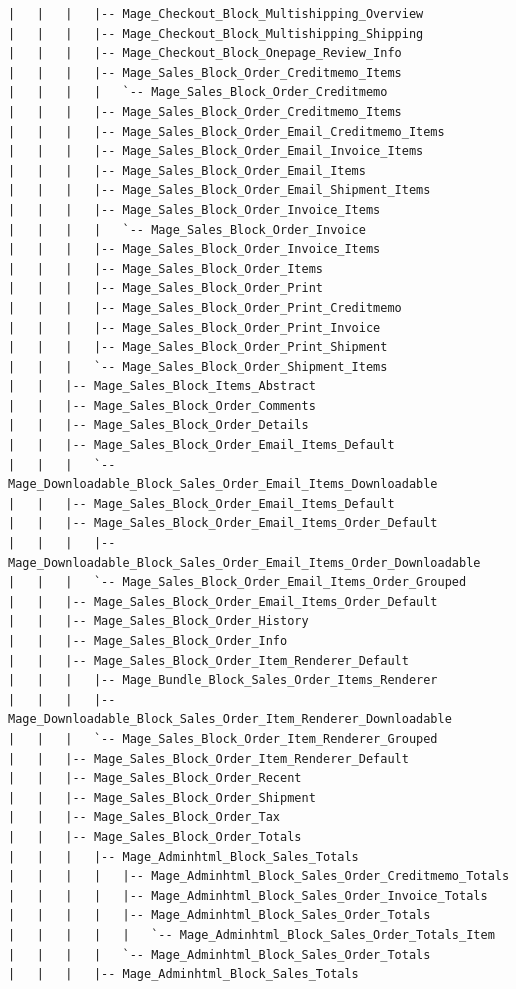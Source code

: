 \documentclass[oneside]{book}
\begin{document}
\begin{lstlisting}
|   |   |   |-- Mage_Checkout_Block_Multishipping_Overview
|   |   |   |-- Mage_Checkout_Block_Multishipping_Shipping
|   |   |   |-- Mage_Checkout_Block_Onepage_Review_Info
|   |   |   |-- Mage_Sales_Block_Order_Creditmemo_Items
|   |   |   |   `-- Mage_Sales_Block_Order_Creditmemo
|   |   |   |-- Mage_Sales_Block_Order_Creditmemo_Items
|   |   |   |-- Mage_Sales_Block_Order_Email_Creditmemo_Items
|   |   |   |-- Mage_Sales_Block_Order_Email_Invoice_Items
|   |   |   |-- Mage_Sales_Block_Order_Email_Items
|   |   |   |-- Mage_Sales_Block_Order_Email_Shipment_Items
|   |   |   |-- Mage_Sales_Block_Order_Invoice_Items
|   |   |   |   `-- Mage_Sales_Block_Order_Invoice
|   |   |   |-- Mage_Sales_Block_Order_Invoice_Items
|   |   |   |-- Mage_Sales_Block_Order_Items
|   |   |   |-- Mage_Sales_Block_Order_Print
|   |   |   |-- Mage_Sales_Block_Order_Print_Creditmemo
|   |   |   |-- Mage_Sales_Block_Order_Print_Invoice
|   |   |   |-- Mage_Sales_Block_Order_Print_Shipment
|   |   |   `-- Mage_Sales_Block_Order_Shipment_Items
|   |   |-- Mage_Sales_Block_Items_Abstract
|   |   |-- Mage_Sales_Block_Order_Comments
|   |   |-- Mage_Sales_Block_Order_Details
|   |   |-- Mage_Sales_Block_Order_Email_Items_Default
|   |   |   `-- Mage_Downloadable_Block_Sales_Order_Email_Items_Downloadable
|   |   |-- Mage_Sales_Block_Order_Email_Items_Default
|   |   |-- Mage_Sales_Block_Order_Email_Items_Order_Default
|   |   |   |-- Mage_Downloadable_Block_Sales_Order_Email_Items_Order_Downloadable
|   |   |   `-- Mage_Sales_Block_Order_Email_Items_Order_Grouped
|   |   |-- Mage_Sales_Block_Order_Email_Items_Order_Default
|   |   |-- Mage_Sales_Block_Order_History
|   |   |-- Mage_Sales_Block_Order_Info
|   |   |-- Mage_Sales_Block_Order_Item_Renderer_Default
|   |   |   |-- Mage_Bundle_Block_Sales_Order_Items_Renderer
|   |   |   |-- Mage_Downloadable_Block_Sales_Order_Item_Renderer_Downloadable
|   |   |   `-- Mage_Sales_Block_Order_Item_Renderer_Grouped
|   |   |-- Mage_Sales_Block_Order_Item_Renderer_Default
|   |   |-- Mage_Sales_Block_Order_Recent
|   |   |-- Mage_Sales_Block_Order_Shipment
|   |   |-- Mage_Sales_Block_Order_Tax
|   |   |-- Mage_Sales_Block_Order_Totals
|   |   |   |-- Mage_Adminhtml_Block_Sales_Totals
|   |   |   |   |-- Mage_Adminhtml_Block_Sales_Order_Creditmemo_Totals
|   |   |   |   |-- Mage_Adminhtml_Block_Sales_Order_Invoice_Totals
|   |   |   |   |-- Mage_Adminhtml_Block_Sales_Order_Totals
|   |   |   |   |   `-- Mage_Adminhtml_Block_Sales_Order_Totals_Item
|   |   |   |   `-- Mage_Adminhtml_Block_Sales_Order_Totals
|   |   |   |-- Mage_Adminhtml_Block_Sales_Totals

\end{lstlisting}
\end{document}
